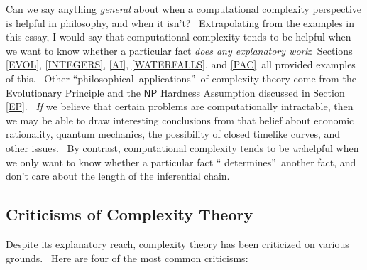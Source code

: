 \documentclass[11pt,onecolumn]{article}%
\begin{document}
Can we say anything \textit{general} about when a computational complexity
perspective is helpful in philosophy, and when it isn't? \ Extrapolating from
the examples in this essay, I would say that computational complexity tends to
be helpful when we want to know whether a particular fact \textit{does any
explanatory work}:\ Sections \ref{EVOL}, \ref{INTEGERS}, \ref{AI},
\ref{WATERFALLS}, and \ref{PAC}\ all provided examples of this. \ Other
\textquotedblleft philosophical\ applications\textquotedblright\ of complexity
theory come from the Evolutionary Principle and the $\mathsf{NP}$ Hardness
Assumption discussed in Section \ref{EP}. \ \textit{If} we believe that
certain problems are computationally intractable, then we may be able to draw
interesting conclusions from that belief about economic rationality, quantum
mechanics, the possibility of closed timelike curves, and other issues. \ By
contrast, computational complexity tends to be \textit{un}helpful when we only
want to know whether a particular fact \textquotedblleft
determines\textquotedblright\ another fact, and don't care about the length of
the inferential chain.

\subsection{Criticisms of Complexity Theory\label{CRITICISMS}}

Despite its explanatory reach, complexity theory has been criticized on
various grounds. \ Here are four of the most common criticisms:
\end{document}
